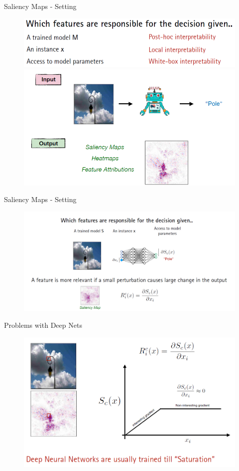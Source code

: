 \documentclass[11pt,compress,t,notes=noshow, aspectratio=169, xcolor=table]{beamer}
\begin{document}
\begin{frame}{Saliency Maps - Setting}
    \begin{figure}
        \centering
        \includegraphics[scale=.4]{bild19}
        \pause
        \includegraphics[scale=.4]{bild20}
    \end{figure}
\end{frame}

\begin{frame}{Saliency Maps - Setting}
    \begin{figure}
        \centering
        \includegraphics[scale=.4]{bild21}
    \end{figure}
\end{frame}

\begin{frame}{Problems with Deep Nets}

    \begin{figure}
        \centering
        \includegraphics[width=0.6\linewidth]{bild22}
    \end{figure}
\end{frame}
\end{document}
